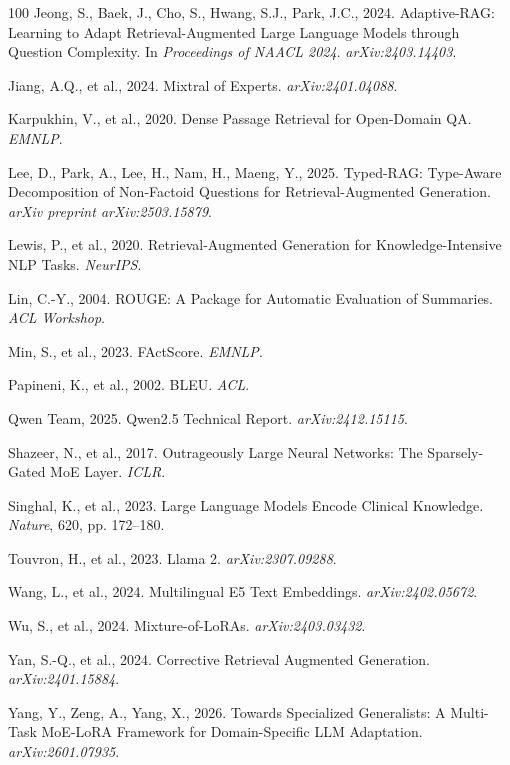 \documentclass[a4paper,fleql,doubleblind]{cas-sc}
\begin{document}
\begin{thebibliography}{100}
Jeong, S., Baek, J., Cho, S., Hwang, S.J., Park, J.C., 2024.
\newblock Adaptive-RAG: Learning to Adapt Retrieval-Augmented Large Language Models through Question Complexity.
\newblock In \textit{Proceedings of NAACL 2024}. \textit{arXiv:2403.14403}.

Jiang, A.Q., et al., 2024. Mixtral of Experts. \textit{arXiv:2401.04088}.


Karpukhin, V., et al., 2020. Dense Passage Retrieval for Open-Domain QA. \textit{EMNLP}.

Lee, D., Park, A., Lee, H., Nam, H., Maeng, Y., 2025. Typed-RAG: Type-Aware
Decomposition of Non-Factoid Questions for Retrieval-Augmented Generation.
\textit{arXiv preprint arXiv:2503.15879}.

Lewis, P., et al., 2020. Retrieval-Augmented Generation for Knowledge-Intensive NLP Tasks. \textit{NeurIPS}.

Lin, C.-Y., 2004. ROUGE: A Package for Automatic Evaluation of Summaries. \textit{ACL Workshop}.


Min, S., et al., 2023. FActScore. \textit{EMNLP}.

Papineni, K., et al., 2002. BLEU. \textit{ACL}.

Qwen Team, 2025. Qwen2.5 Technical Report. \textit{arXiv:2412.15115}.


Shazeer, N., et al., 2017. Outrageously Large Neural Networks: The Sparsely-Gated MoE Layer. \textit{ICLR}.

Singhal, K., et al., 2023. Large Language Models Encode Clinical Knowledge. \textit{Nature}, 620, pp. 172--180.

Touvron, H., et al., 2023. Llama 2. \textit{arXiv:2307.09288}.

Wang, L., et al., 2024. Multilingual E5 Text Embeddings. \textit{arXiv:2402.05672}.


Wu, S., et al., 2024. Mixture-of-LoRAs. \textit{arXiv:2403.03432}.

Yan, S.-Q., et al., 2024. Corrective Retrieval Augmented Generation. \textit{arXiv:2401.15884}.

Yang, Y., Zeng, A., Yang, X., 2026.
\newblock Towards Specialized Generalists: A Multi-Task MoE-LoRA Framework for Domain-Specific LLM Adaptation.
\newblock \textit{arXiv:2601.07935}.


\end{thebibliography}
\end{document}

